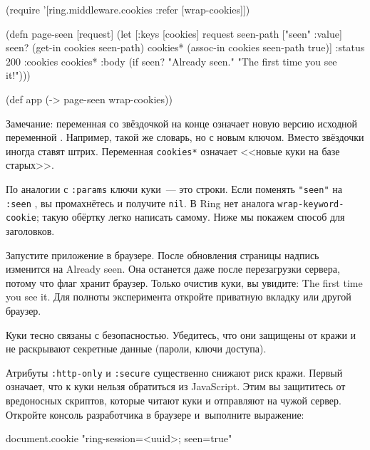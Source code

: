 \else

\begin{english}
  \begin{clojure/lines}
(require '[ring.middleware.cookies
           :refer [wrap-cookies]])

(defn page-seen [request]
  (let [{:keys [cookies]} request
        seen-path ["seen" :value]
        seen? (get-in cookies seen-path)
        cookies* (assoc-in cookies seen-path true)]
    {:status 200
     :cookies cookies*
     :body (if seen?
             "Already seen."
             "The first time you see it!")}))

(def app (-> page-seen
             wrap-cookies))
  \end{clojure/lines}
\end{english}

\fi

Замечание: переменная со звёздочкой на конце означает новую версию исходной
переменной \ifx\DEVICETYPE\MOBILE{}\else{}\fi. Например, такой же словарь, но с новым ключом. Вместо
звёздочки иногда ставят штрих. Переменная \verb|cookies*| означает <<новые
куки на базе старых>>.


По аналогии с \verb|:params| ключи куки~--- это строки. Если поменять
\verb|"seen"| на \verb|:seen| , вы промахнётесь и получите
\verb|nil|. В Ring нет аналога \verb|wrap-keyword-cookie|; такую обёртку
легко написать самому. Ниже мы покажем способ для заголовков.

Запустите приложение в браузере. После обновления страницы надпись изменится на
Already seen. Она останется даже после перезагрузки сервера, потому что флаг
хранит браузер. Только очистив куки, вы увидите: The first time you see
it. Для полноты эксперимента откройте приватную вкладку или другой браузер.


Куки тесно связаны с безопасностью. Убедитесь, что они защищены от кражи и не
раскрывают секретные данные (пароли, ключи доступа).

Атрибуты \verb|:http-only| и \verb|:secure| существенно снижают риск
кражи. Первый означает, что к куки нельзя обратиться из JavaScript. Этим вы
защититесь от вредоносных скриптов, которые читают куки и отправляют на чужой
сервер. Откройте консоль разработчика в браузере и~выполните выражение:

\begin{english}
  \begin{js}
document.cookie
"ring-session=<uuid>; seen=true"
  \end{js}
\end{english}

